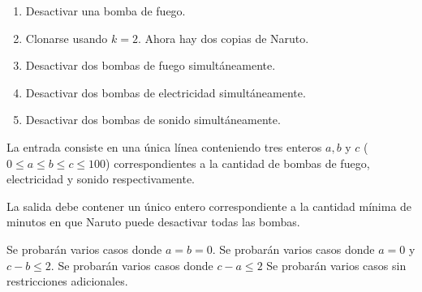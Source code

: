 \documentclass{oci}
\begin{document}
\begin{problemDescription}
\begin{enumerate}
\item Desactivar una bomba de fuego.
\item Clonarse usando $k = 2$. Ahora hay dos copias de Naruto.
\item Desactivar dos bombas de fuego simultáneamente.
\item Desactivar dos bombas de electricidad simultáneamente.
\item Desactivar dos bombas de sonido simultáneamente.
\end{enumerate}

\end{problemDescription}

\begin{inputDescription}
  La entrada consiste en una única línea conteniendo tres enteros $a, b$ y $c$
  ($0\leq a \leq b \leq c \leq 100$) correspondientes a la cantidad de bombas de fuego,
  electricidad y sonido respectivamente.
\end{inputDescription}

\begin{outputDescription}
  La salida debe contener un único entero correspondiente a la cantidad mínima
  de minutos en que Naruto puede desactivar todas las bombas.
\end{outputDescription}

\begin{scoreDescription}
   Se probarán varios casos donde $a = b = 0$.
   Se probarán varios casos donde $a = 0$ y $c - b \leq 2$.
   Se probarán varios casos donde $c - a \leq 2$
   Se probarán varios casos sin restricciones adicionales.
\end{scoreDescription}

\begin{sampleDescription}
\end{sampleDescription}
\end{document}
